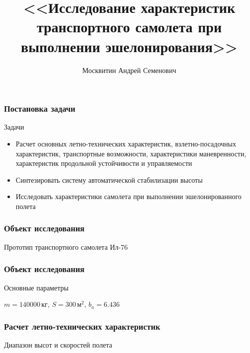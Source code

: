 \documentclass{beamer}
\title{<<Исследование характеристик транспортного самолета при выполнении эшелонирования>>}
\author{Москвитин Андрей Семенович}
\institute{М1О-403Б-18}
\date{}
\begin{document}
\begin{noheadline}
\maketitle
\end{noheadline}

\begin{frame}
\frametitle{Постановка задачи}
\begin{block}{Задачи}
    \begin{itemize}
        \item Расчет основных летно-технических характеристик, взлетно-посадочных
            характеристик, транспортные возможности, характеристики
            маневренности, характеристик продольной устойчивости и
            управляемости 
        \item Синтезировать систему автоматической стабилизации высоты 
        \item Исследовать характеристики самолета при выполнении эшелонированного полета 
    \end{itemize}
\end{block}
\end{frame}

\begin{frame}
\frametitle{Объект исследования}
Прототип транспортного самолета Ил-76
\begin{figure}
\end{figure}
\end{frame}

\begin{frame}
    \frametitle{Объект исследования}
    Основные параметры
    \vfill
    \begin{center}
    $m=140000\, кг$, $S=300\, м^2$, $b_a = 6.436$
    \end{center}
    \vfill
\end{frame}

\begin{frame}
    \frametitle{Расчет летно-технических характеристик}
    \begin{center}
   Диапазон высот и скоростей полета 
\resizebox{0.85\textwidth}{!}{
{}
}
\end{center}
\end{frame}
\end{document}
